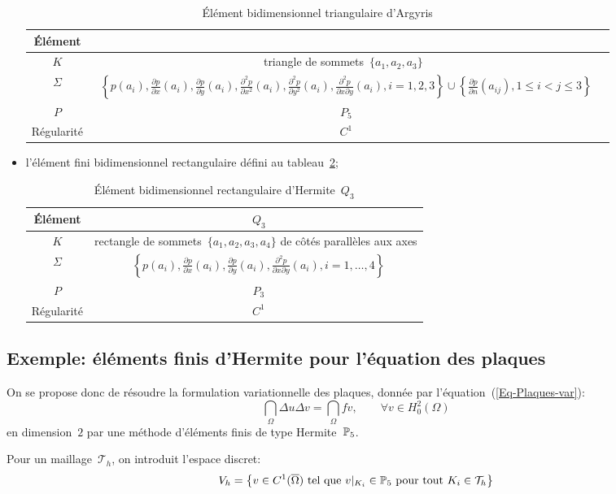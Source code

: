 \begin{itemize}
\begin{table}[h!]
\begin{tabular}{c|cc}
Élément & \\
\hline
$K$	  & triangle de sommets~$\{a_1, a_2, a_3\}$ \\
$\Sigma$ &~$\left\{p(a_i), \frac{\partial p}{\partial x}(a_i), \frac{\partial p}{\partial y}(a_i),
		\frac{\partial^2 p}{\partial x^2}(a_i), \frac{\partial^2 p}{\partial y^2}(a_i),
		\frac{\partial^2 p}{\partial x\partial y}(a_i), i=1, 2, 3\right\}
		\cup\left\{\frac{\partial p}{\partial n}(a_{ij}), 1\le i<j\le3\right\}$\\
$P$   &~$P_5$\\
Régularité &~$C^1$\\
\hline
\end{tabular}
\caption{Élément bidimensionnel triangulaire d'Argyris}\label{tab:ElemA:bi}
\end{table}
\item l'élément fini bidimensionnel rectangulaire défini au tableau~\ref{tab:ElemH:bibi};

\begin{table}[h!]\centering\small
\begin{tabular}{c|c}
Élément &~$Q_3$ \\
\hline
$K$	  & rectangle de sommets~$\{a_1, a_2, a_3, a_4\}$ de côtés parallèles aux axes\\
$\Sigma$ &~$\left\{p(a_i), \frac{\partial p}{\partial x}(a_i), \frac{\partial p}{\partial y}(a_i),
	\frac{\partial^2 p}{\partial x\partial y}(a_i), i=1,\ldots, 4\right\}$\\
$P$   &~$P_3$ \\
Régularité &~$C^1$\\
\hline
\end{tabular}
\caption{Élément bidimensionnel rectangulaire d'Hermite~$Q_3$}\label{tab:ElemH:bibi}
\end{table}
\end{itemize}


\medskip
\subsection{Exemple: éléments finis d'Hermite pour l'équation des plaques}

On se propose donc de résoudre la formulation variationnelle des plaques, donnée par l'équation~(\ref{Eq-Plaques-var}):
\[
\dint_\Omega \Delta u\Delta v = \dint_\Omega fv, \qquad \forall v\in H^2_0(\Omega)
\]
en dimension~$2$ par une méthode d'éléments finis de type Hermite~$\mathbb P_5$.

Pour un maillage~$\mathcal{T}_h$, on introduit l'espace discret:
\[ V_h = \left\{ v\in C^1(\overline{\Omega}) \text{ tel que } v|_{K_i} \in\mathbb P_5 \text{ pour tout }K_i\in\mathcal{T}_h\right\} \]

